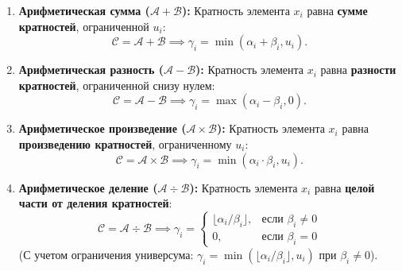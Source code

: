 \begin{enumerate}
    \item \textbf{Арифметическая сумма ($\mathcal{A} + \mathcal{B}$):} Кратность элемента $x_i$ равна \textbf{сумме кратностей}, ограниченной $u_i$:
    $$\mathcal{C} = \mathcal{A} + \mathcal{B} \implies \gamma_i = \min(\alpha_i + \beta_i, u_i).$$

    \item \textbf{Арифметическая разность ($\mathcal{A} - \mathcal{B}$):} Кратность элемента $x_i$ равна \textbf{разности кратностей}, ограниченной снизу нулем:
    $$\mathcal{C} = \mathcal{A} - \mathcal{B} \implies \gamma_i = \max(\alpha_i - \beta_i, 0).$$

    \item \textbf{Арифметическое произведение ($\mathcal{A} \times \mathcal{B}$):} Кратность элемента $x_i$ равна \textbf{произведению кратностей}, ограниченному $u_i$:
    $$\mathcal{C} = \mathcal{A} \times \mathcal{B} \implies \gamma_i = \min(\alpha_i \cdot \beta_i, u_i).$$

    \item \textbf{Арифметическое деление ($\mathcal{A} \div \mathcal{B}$):} Кратность элемента $x_i$ равна \textbf{целой части от деления кратностей}:
    $$\mathcal{C} = \mathcal{A} \div \mathcal{B} \implies \gamma_i = \begin{cases}
        \lfloor \alpha_i / \beta_i \rfloor, & \text{если } \beta_i \ne 0 \\
        0, & \text{если } \beta_i = 0
    \end{cases} $$
    (С учетом ограничения универсума: $\gamma_i = \min(\lfloor \alpha_i / \beta_i \rfloor, u_i)$ при $\beta_i \ne 0$).
\end{enumerate}